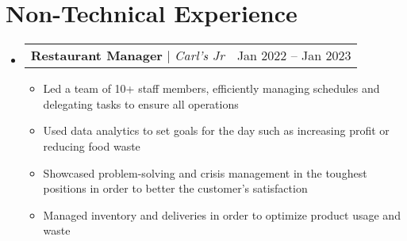\documentclass[letterpaper,11pt]{article}
\makeatletter
\newcommand{\resumeItem}[1]{
  \item\small{
    {#1 \vspace{-2pt}}
  }
}
\newcommand{\resumeProjectHeading}[2]{
    \item
    \begin{tabular*}{0.97\textwidth}{l@{\extracolsep{\fill}}r}
      \small#1 & #2 \\
    \end{tabular*}\vspace{-7pt}
}
\newcommand{\resumeSubHeadingListStart}{\begin{itemize}[leftmargin=0.15in, label={}]}
\newcommand{\resumeSubHeadingListEnd}{\end{itemize}}
\newcommand{\resumeItemListStart}{\begin{itemize}}
\newcommand{\resumeItemListEnd}{\end{itemize}\vspace{-5pt}}
\makeatother
\begin{document}

\section{Non-Technical Experience}
    \resumeSubHeadingListStart
        \resumeProjectHeading
            {\textbf{Restaurant Manager} $|$ \emph{Carl's Jr}}{Jan 2022 -- Jan 2023}
            \resumeItemListStart
                \resumeItem{Led a team of 10+ staff members, efficiently managing schedules and delegating tasks to ensure all operations}
                \resumeItem{Used data analytics to set goals for the day such as increasing profit or reducing food waste}
                \resumeItem{Showcased problem-solving and crisis management in the toughest positions in order to better the customer's satisfaction}
                \resumeItem{Managed inventory and deliveries in order to optimize product usage and waste}
            \resumeItemListEnd
    \resumeSubHeadingListEnd
\end{document}
